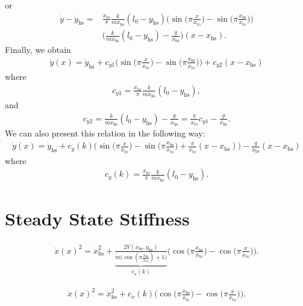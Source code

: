 \documentclass[journal,12pt,onecolumn]{IEEEtran}
\begin{document}
or
\begin{align}\nonumber
	\dot{y}-\dot{y}_{\text{hs}}= 	&\frac{x_{\text{to}}}{\pi} \frac{k}{m \dot{x}_{\text{hs}}} (l_0-y_\text{hs}) \Big(\sin \Big(\pi\frac{x}{x_\text{to}}\Big) - \sin \Big(\pi\frac{x_\text{hs}}{x_\text{to}} \Big) \Big)\\ \nonumber
	& \Big( \frac{k}{m \dot{x}_{\text{hs}}} (l_0-y_\text{hs}) -\frac{g}{\dot{x}_{\text{hs}}} \Big) (x-x_{\text{hs}}).
\end{align}
Finally, we obtain
\begin{align}
\dot{y}(x) =\dot{y}_{\text{hs}} + c_{y1} \Big(\sin \Big(\pi\frac{x}{x_\text{to}}\Big) - \sin \Big(\pi\frac{x_\text{hs}}{x_\text{to}} \Big) \Big) + c_{y2}(x-x_{\text{hs}}) 
\end{align}
where 
\begin{align}
	c_{y1} = \frac{x_{\text{to}}}{\pi} \frac{k}{m \dot{x}_{\text{hs}}} (l_0-y_\text{hs}),
\end{align}
and
\begin{align}
c_{y2} = \frac{k}{m \dot{x}_{\text{hs}}} (l_0-y_\text{hs}) -\frac{g}{\dot{x}_{\text{hs}}} = \frac{\pi}{x_{\text{to}}} c_{y1} -\frac{g}{\dot{x}_{\text{hs}}}.
\end{align}
We can also present this relation in the following way:
\begin{align}
	\dot{y}(x) =\dot{y}_{\text{hs}} + c_{y}(k) \Big(\sin \Big(\pi\frac{x}{x_\text{to}}\Big) - \sin \Big(\pi\frac{x_\text{hs}}{x_\text{to}} \Big) + \frac{\pi}{x_{\text{to}}}(x-x_{\text{hs}}) \Big) - \frac{g}{\dot{x}_{\text{hs}}}(x-x_{\text{hs}})
\end{align}
where 
\begin{align}
	c_{y}(k) = \frac{x_{\text{to}}}{\pi} \frac{k}{m \dot{x}_{\text{hs}}} (l_0-y_\text{hs}).
\end{align}

\section{Steady State Stiffness}
\begin{align}
	\dot{x}(x)^2 = \dot{x}_{\text{hs}}^2 + \underbrace{\frac{2V(x_\text{hs},y_\text{hs})}{m\Big(\cos(\pi \frac{x_{\text{hs}}}{x_{\text{to}}})+1 \Big)} }_{c_x(k)}\Big(\cos\big(\pi \frac{x_{\text{hs}}}{x_{\text{to}}} \big) - \cos\big(\pi \frac{x}{x_{\text{to}}} \big)\Big).
\end{align}

\begin{align}
	\dot{x}(x)^2 = \dot{x}_{\text{hs}}^2 + c_x(k)\Big(\cos\big(\pi \frac{x_{\text{hs}}}{x_{\text{to}}} \big) - \cos\big(\pi \frac{x}{x_{\text{to}}} \big)\Big).
\end{align}
\end{document}
